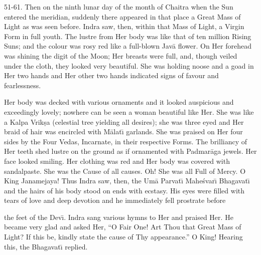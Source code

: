 51-61. Then on the ninth lunar day of the month of Chaitra when the Sun entered the meridian, suddenly there appeared in that place a Great Mass of Light as was seen before. Indra saw, then, within that Mass of Light, a Virgin Form in full youth. The lustre from Her body was like that of ten million Rising Suns; and the colour was rosy red like a full-blown Jav\=a flower. On Her forehead was shining the digit of the Moon; Her breasts were full, and, though veiled under the cloth, they looked very beautiful. She was holding noose and a goad in Her two hands and Her other two hands indicated signs of favour and fearlessness.

Her body was decked with various ornaments and it looked auspicious and exceedingly lovely; nowhere can be seen a woman beautiful like Her. She was like a Kalpa Vrik\d{s}a (celestial tree yielding all desires); she was three eyed and Her braid of hair was encircled with M\=alat\={\i} garlands. She was praised on Her four sides by the Four Vedas, Incarnate, in their respective Forms. The brilliancy of Her teeth shed lustre on the ground as if ornamented with Padmar\=aga jewels. Her face looked smiling. Her clothing was red and Her body was covered with sandalpaste. She was the Cause of all causes. Oh! She was all Full of Mercy. O King Janamejaya! Thus Indra saw, then, the Um\=a Parvat\={\i} Mahe\'svar\={\i} Bhagavat\={\i} and the hairs of his body stood on ends with ecstasy. His eyes were filled with tears of love and deep devotion and he immediately fell prostrate before

the feet of the Dev\={\i}. Indra sang various hymns to Her and praised Her. He became very glad and asked Her, ``O Fair One! Art Thou that Great Mass of Light? If this be, kindly state the cause of Thy appearance.'' O King! Hearing this, the Bhagavat\={\i} replied.

